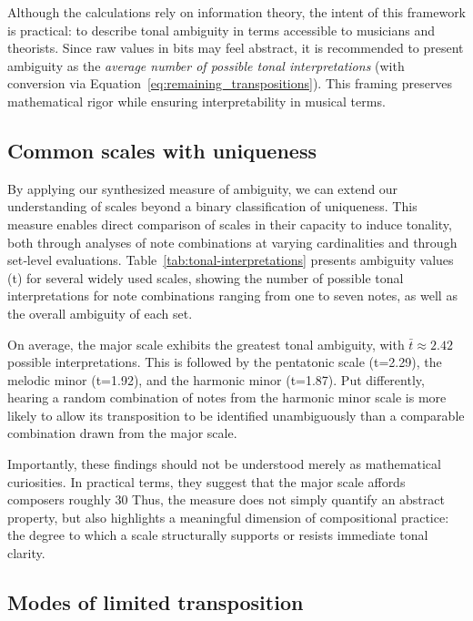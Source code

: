 \documentclass[10pt,twocolumn]{article}
\numberwithin{equation}{section} %
\begin{document}
    Although the calculations rely on information theory, the intent of this framework is practical: to describe tonal ambiguity in terms accessible to musicians and theorists.
    Since raw values in bits may feel abstract, it is recommended to present ambiguity as the \textit{average number of possible tonal interpretations} (with conversion via Equation~\ref{eq:remaining_transpositions}).
    This framing preserves mathematical rigor while ensuring interpretability in musical terms.

    \subsection{Common scales with uniqueness}

    By applying our synthesized measure of ambiguity, we can extend our understanding of scales beyond a binary classification of uniqueness.
    This measure enables direct comparison of scales in their capacity to induce tonality, both through analyses of note combinations at varying cardinalities and through set‑level evaluations.
    Table~\ref{tab:tonal-interpretations} presents ambiguity values (t) for several widely used scales, showing the number of possible tonal interpretations for note combinations ranging from one to seven notes, as well as the overall ambiguity of each set.

    On average, the major scale exhibits the greatest tonal ambiguity, with $\bar{t}\approx 2.42$ possible interpretations.
    This is followed by the pentatonic scale (t=2.29), the melodic minor (t=1.92), and the harmonic minor (t=1.87).
    Put differently, hearing a random combination of notes from the harmonic minor scale is more likely to allow its transposition to be identified unambiguously than a comparable combination drawn from the major scale.

    Importantly, these findings should not be understood merely as mathematical curiosities.
    In practical terms, they suggest that the major scale affords composers roughly 30%
    Thus, the measure does not simply quantify an abstract property, but also highlights a meaningful dimension of compositional practice: the degree to which a scale structurally supports or resists immediate tonal clarity.

    

    \subsection{Modes of limited transposition}
\end{document}
